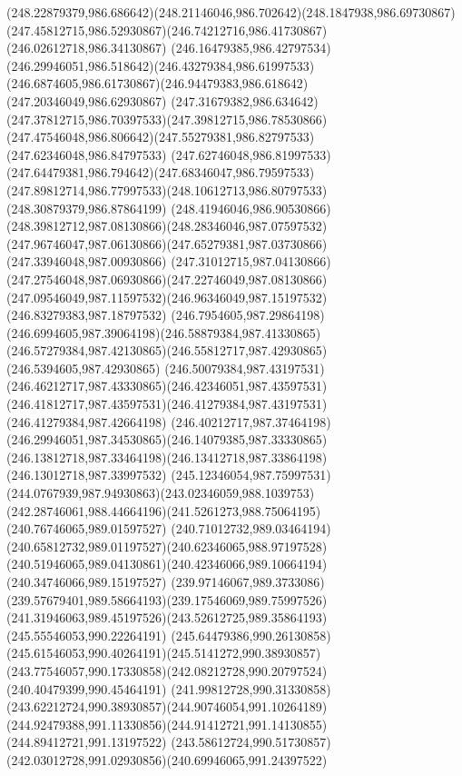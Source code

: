 {{	\curveto(248.22879379,986.686642)(248.21146046,986.702642)(248.1847938,986.69730867)
	\curveto(247.45812715,986.52930867)(246.74212716,986.41730867)(246.02612718,986.34130867)
	\curveto(246.16479385,986.42797534)(246.29946051,986.518642)(246.43279384,986.61997533)
	\curveto(246.6874605,986.61730867)(246.94479383,986.618642)(247.20346049,986.62930867)
	\curveto(247.31679382,986.634642)(247.37812715,986.70397533)(247.39812715,986.78530866)
	\curveto(247.47546048,986.806642)(247.55279381,986.82797533)(247.62346048,986.84797533)
	\curveto(247.62746048,986.81997533)(247.64479381,986.794642)(247.68346047,986.79597533)
	\curveto(247.89812714,986.77997533)(248.10612713,986.80797533)(248.30879379,986.87864199)
	\curveto(248.41946046,986.90530866)(248.39812712,987.08130866)(248.28346046,987.07597532)
	\curveto(247.96746047,987.06130866)(247.65279381,987.03730866)(247.33946048,987.00930866)
	\curveto(247.31012715,987.04130866)(247.27546048,987.06930866)(247.22746049,987.08130866)
	\curveto(247.09546049,987.11597532)(246.96346049,987.15197532)(246.83279383,987.18797532)
	\curveto(246.7954605,987.29864198)(246.6994605,987.39064198)(246.58879384,987.41330865)
	\curveto(246.57279384,987.42130865)(246.55812717,987.42930865)(246.5394605,987.42930865)
	\curveto(246.50079384,987.43197531)(246.46212717,987.43330865)(246.42346051,987.43597531)
	\curveto(246.41812717,987.43597531)(246.41279384,987.43197531)(246.41279384,987.42664198)
	\curveto(246.40212717,987.37464198)(246.29946051,987.34530865)(246.14079385,987.33330865)
	\curveto(246.13812718,987.33464198)(246.13412718,987.33864198)(246.13012718,987.33997532)
	\curveto(245.12346054,987.75997531)(244.0767939,987.94930863)(243.02346059,988.1039753)
	\curveto(242.28746061,988.44664196)(241.5261273,988.75064195)(240.76746065,989.01597527)
	\curveto(240.71012732,989.03464194)(240.65812732,989.01197527)(240.62346065,988.97197528)
	\curveto(240.51946065,989.04130861)(240.42346066,989.10664194)(240.34746066,989.15197527)
	\curveto(239.97146067,989.3733086)(239.57679401,989.58664193)(239.17546069,989.75997526)
	\curveto(241.31946063,989.45197526)(243.52612725,989.35864193)(245.55546053,990.22264191)
	\curveto(245.64479386,990.26130858)(245.61546053,990.40264191)(245.5141272,990.38930857)
	\curveto(243.77546057,990.17330858)(242.08212728,990.20797524)(240.40479399,990.45464191)
	\curveto(241.99812728,990.31330858)(243.62212724,990.38930857)(244.90746054,991.10264189)
	\curveto(244.92479388,991.11330856)(244.91412721,991.14130855)(244.89412721,991.13197522)
	\curveto(243.58612724,990.51730857)(242.03012728,991.02930856)(240.69946065,991.24397522)
}}
